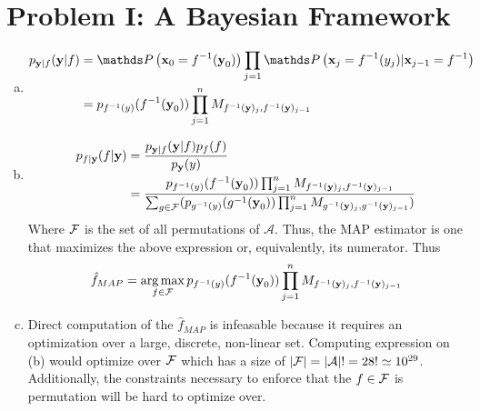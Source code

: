 \documentclass{siamart190516}
\begin{document}
\maketitle

\section*{Problem I: A Bayesian Framework}
\label{sec:bayesian}


\begin{enumerate}[(a)]

  \item \begin{align*}
          p_{\textbf{y}|f}(\textbf{y}|f) & = \prob{ \textbf{x}_0 = \inv{f}(\textbf{y}_0)} \prod_{j = 1} \prob{\textbf{x}_j = \inv{f}(y_j) | \textbf{x}_{j-1} = \inv{f}} \\
                                         & = p_{\inv{f}(y)}(\inv{f}(\textbf{y}_0)) \prod_{j = 1}^n M_{\inv{f}(\textbf{y})_{j}, \inv{f}(\textbf{y})_{j-1}}
        \end{align*}

  \item \begin{align*}
          p_{f|\textbf{y}}(f | \textbf{y}) & = \frac{ p_{\textbf{y}|f}(\textbf{y}|f) p_{f}(f) }{p_\textbf{y}(y)}                                                                                                                                                                                  \\
                                           & = \frac{p_{f^{-1}(y)}(f^{-1}(\textbf{y}_0)) \prod_{j = 1}^n M_{f^{-1}(\textbf{y})_{j}, f^{-1}(\textbf{y})_{j-1}}}{\sum_{g \in \mathcal{F}}(p_{g^{-1}(y)}(g^{-1}(\textbf{y}_0)) \prod_{j = 1}^n M_{g^{-1}(\textbf{y})_{j}, g^{-1}(\textbf{y})_{j-1}})}
        \end{align*}
        Where $\mathcal{F}$ is the set of all permutations of $\mathcal{A}$. Thus, the MAP estimator is one that maximizes the above expression or, equivalently, its numerator. Thus
        \[
          \hat{f}_{MAP} = \operatorname*{arg\,max}_{f \in \mathcal{F}} p_{f^{-1}(y)}(f^{-1}(\textbf{y}_0)) \prod_{j = 1}^n M_{f^{-1}(\textbf{y})_{j}, f^{-1}(\textbf{y})_{j-1}}
        \]
  \item Direct computation of the $\hat{f}_{MAP}$ is infeasable because it requires an optimization over a large, discrete, non-linear set. Computing expression on (b) would optimize over $\mathcal{F}$ which has a size of $\left| \mathcal{F} \right| = \left| \mathcal{A} \right|! = 28! \simeq 10^{29}$. Additionally, the constraints necessary to enforce that the $f \in \mathcal{F}$ is permutation will be hard to optimize over.
\end{enumerate}
\end{document}
